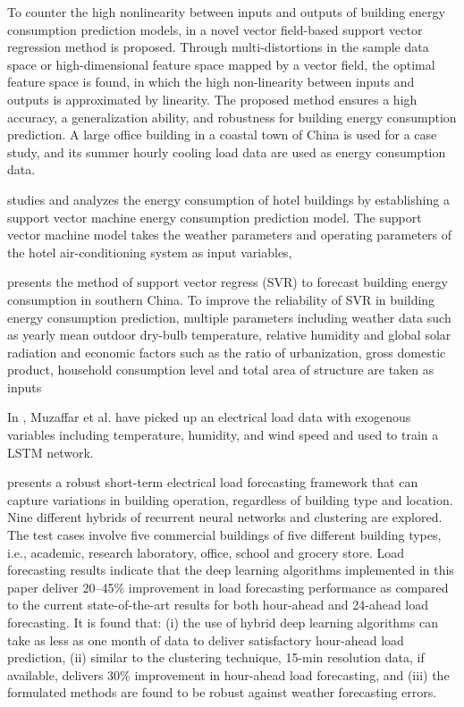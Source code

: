 To counter the high nonlinearity between inputs and outputs of building energy consumption prediction models, in \cite{ZHONG2019403} a novel vector field-based support vector regression method is proposed.
Through multi-distortions in the sample data space or high-dimensional feature space mapped by a vector field, the optimal feature space is found, in which the high non-linearity between inputs and outputs is approximated by linearity. 
The proposed method ensures a high accuracy, a generalization ability, and robustness for building energy consumption prediction.
A large office building in a coastal town of China is used for a case study, and its summer hourly cooling load data are used as energy consumption data.

\cite{SHAO2020102128} studies and analyzes the energy consumption of hotel buildings by establishing a support vector machine energy consumption prediction model.
The support vector machine model takes the weather parameters and operating parameters of the hotel air-conditioning system as input variables,

\cite{MA20193433} presents the method of support vector regress (SVR) to forecast building energy consumption in southern China.
To improve the reliability of SVR in building energy consumption prediction, multiple parameters including weather data such as yearly mean outdoor dry-bulb temperature, relative humidity and global solar radiation and economic factors such as the ratio of urbanization, gross domestic product, household consumption level and total area of structure are taken as inputs

In \cite{MUZAFFAR20192922}, Muzaffar et al. have picked up an electrical load data with exogenous variables including temperature, humidity, and wind speed and used to train a LSTM network. 

\cite{CHITALIA2020115410}  presents a robust short-term electrical load forecasting framework that can capture variations in building operation, regardless of building type and location.
Nine different hybrids of recurrent neural networks and clustering are explored.
The test cases involve five commercial buildings of five different building types, i.e., academic, research laboratory, office, school and grocery store.
Load forecasting results indicate that the deep learning algorithms implemented in this paper deliver 20–45\% improvement in load forecasting performance as compared to the current state-of-the-art results for both hour-ahead and 24-ahead load forecasting.
It is found that:
(i) the use of hybrid deep learning algorithms can take as less as one month of data to deliver satisfactory hour-ahead load prediction,
(ii) similar to the clustering technique, 15-min resolution data, if available, delivers 30\% improvement in hour-ahead load forecasting,
and (iii) the formulated methods are found to be robust against weather forecasting errors.

